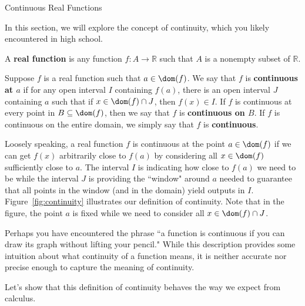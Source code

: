 \begin{section}{Continuous Real Functions}\label{sec:Continuity}

In this section, we will explore the concept of continuity, which you likely encountered in high school.

\begin{definition}
A \textbf{real function} is any function $f:A\to \mathbb{R}$ such that $A$ is a nonempty subset of $\mathbb{R}$. 
\end{definition}

\begin{definition}\label{def:continuity}
Suppose $f$ is a real function such that $a\in \dom(f)$. We say that $f$ is \textbf{continuous at $a$} if for any open interval $I$ containing $f(a)$, there is an open interval $J$ containing $a$ such that if $x\in \dom(f)\cap J$, then $f(x)\in I$. If $f$ is continuous at every point in $B\subseteq\dom(f)$, then we say that $f$ is \textbf{continuous on $B$}. If $f$ is continuous on the entire domain, we simply say that $f$ is \textbf{continuous}.
\end{definition}

Loosely speaking, a real function $f$ is continuous at the point $a\in\dom(f)$ if we can get $f(x)$ arbitrarily close to $f(a)$ by considering all $x\in\dom(f)$ sufficiently close to $a$.  The interval $I$ is indicating how close to $f(a)$ we need to be while the interval $J$ is providing the ``window" around $a$ needed to guarantee that all points in the window (and in the domain) yield outputs in $I$. Figure~\ref{fig:continuity} illustrates our definition of continuity. Note that in the figure, the point $a$ is fixed while we need to consider all $x\in\dom(f)\cap J$.

Perhaps you have encountered the phrase ``a function is continuous if you can draw its graph without lifting your pencil." While this description provides some intuition about what continuity of a function means, it is neither accurate nor precise enough to capture the meaning of continuity.

Let's show that this definition of continuity behaves the way we expect from calculus.

\begin{figure}[h!]
\centering
{}
\end{figure}
\end{section}
